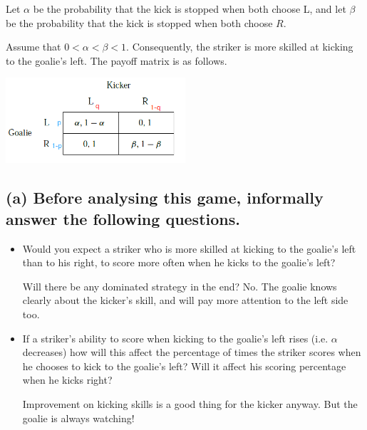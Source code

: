 \documentclass{article}
\begin{document}
Let $\alpha$ be the probability that the kick is stopped when both choose
L, and let $\beta$ be the probability that the kick is stopped when both choose $R$. 

Assume that $0 < \alpha < \beta < 1$. Consequently, the striker is more skilled at kicking to the goalie's left. The payoff matrix is as follows.

\begin{center}
{\includegraphics[width=0.5\textwidth]{8.q7_13}
\label{fig:q7_13}
\vspace{2mm}}
\end{center}


\subsection*{(a) Before analysing this game, informally answer the following questions.}

\begin{itemize}
\item Would you expect a striker who is more skilled at kicking to the goalie's left than to his right, to score more often when he kicks to the goalie's left?

\begin{mdframed}[backgroundcolor=blue!20,linecolor=white]
Will there be any dominated strategy in the end? No. The goalie knows clearly about the kicker's skill, and will pay more attention to the left side too.


\end{mdframed}


\item If a striker's ability to score when kicking to the goalie's left rises (i.e. $\alpha$ decreases) how will this affect the percentage of times the striker scores when he chooses to kick to the goalie's left? Will it affect his scoring percentage when he kicks right?

\begin{mdframed}[backgroundcolor=blue!20,linecolor=white]
Improvement on kicking skills is a good thing for the kicker anyway. But the goalie is always watching!
\end{mdframed}

\end{itemize}
\end{document}
